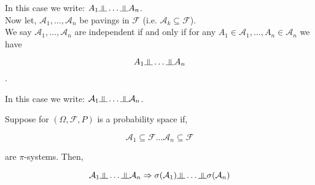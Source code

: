 \documentclass[11pt,fleqn]{book} %
\newcommand{\indep}{\rotatebox[origin=c]{90}{$\models$}}
\begin{document}
In this case we write: $A_1 \indep \dots \indep A_n$.\\


Now let, $\mathcal{A}_1, \dots, \mathcal{A}_n$ be pavings in $\mathcal{F}$ (i.e. $\mathcal{A}_k \subseteq \mathcal{F}$). \\

We say $\mathcal{A}_1, \dots, \mathcal{A}_n$ are independent if and only if for any $A_1 \in \mathcal{A}_1, \dots, A_n \in \mathcal{A}_n$ we have 

$$A_1 \indep \dots \indep A_n $$. 

In this case we write: $\mathcal{A}_1 \indep \dots \indep \mathcal{A}_n$.

\begin{theorem}
	Suppose for $(\Omega, \mathcal{F}, P)$ is a probability space if, 

	$$\mathcal{A}_1 \subseteq \mathcal{F} \dots \mathcal{A}_n \subseteq \mathcal{F}$$

	are $\pi$-systems. Then,

	$$\mathcal{A}_1 \indep \dots \indep \mathcal{A}_n  \Rightarrow \sigma(\mathcal{A}_1) \indep \dots \indep \sigma(\mathcal{A}_n)$$
\end{theorem}
\end{document}
